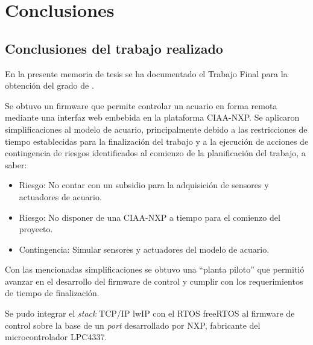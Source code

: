 
\chapter{Conclusiones} %

\label{Chapter5} %




\section{Conclusiones del trabajo realizado}

En la presente memoria de tesis se ha documentado el Trabajo Final para la obtención del grado de \degreename.  

Se obtuvo un firmware que permite controlar un acuario en forma remota mediante una interfaz web embebida en la plataforma CIAA-NXP. Se aplicaron simplificaciones al modelo de acuario, principalmente debido a las restricciones de tiempo establecidas para la finalización del trabajo y a la ejecución de acciones de contingencia de riesgos identificados al comienzo de la planificación del trabajo, a saber:

\begin{itemize}
	\item Riesgo: No contar con un subsidio para la adquisición de sensores y actuadores de acuario.
	\item Riesgo: No disponer de una CIAA-NXP a tiempo para el comienzo del proyecto.
	\item Contingencia:  Simular sensores y actuadores del modelo de acuario.
\end{itemize}

Con las mencionadas simplificaciones se obtuvo una ``planta piloto'' que permitió avanzar en el desarrollo del firmware de control y cumplir con los requerimientos de tiempo de finalización.

Se pudo integrar el \textit{stack} TCP/IP lwIP con el RTOS freeRTOS al firmware de control sobre la base de un \textit{port} desarrollado por NXP, fabricante del microcontrolador LPC4337.

